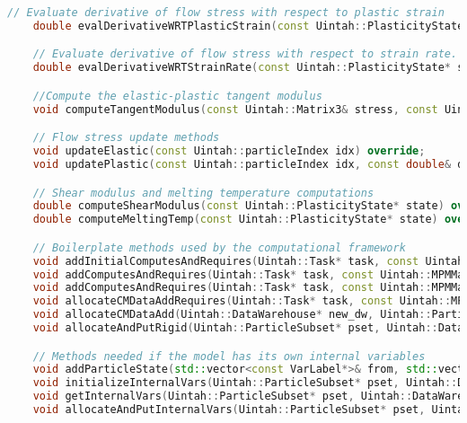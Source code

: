 \begin{enumerate}
\begin{lstlisting}[language=Cpp]
    // Evaluate derivative of flow stress with respect to plastic strain
    double evalDerivativeWRTPlasticStrain(const Uintah::PlasticityState* state, const Uintah::particleIndex idx) override;

    // Evaluate derivative of flow stress with respect to strain rate.
    double evalDerivativeWRTStrainRate(const Uintah::PlasticityState* state, const Uintah::particleIndex idx) override;

    //Compute the elastic-plastic tangent modulus
    void computeTangentModulus(const Uintah::Matrix3& stress, const Uintah::PlasticityState* state, const double& delT, const Uintah::MPMMaterial* matl, const Uintah::particleIndex idx, Uintah::TangentModulusTensor& Ce, Uintah::TangentModulusTensor& Cep) override;

    // Flow stress update methods
    void updateElastic(const Uintah::particleIndex idx) override;
    void updatePlastic(const Uintah::particleIndex idx, const double& delGamma) override;

    // Shear modulus and melting temperature computations
    double computeShearModulus(const Uintah::PlasticityState* state) override;
    double computeMeltingTemp(const Uintah::PlasticityState* state) override;

    // Boilerplate methods used by the computational framework
    void addInitialComputesAndRequires(Uintah::Task* task, const Uintah::MPMMaterial* matl, const Uintah::PatchSet* patches) override;
    void addComputesAndRequires(Uintah::Task* task, const Uintah::MPMMaterial* matl, const Uintah::PatchSet* patches) override;
    void addComputesAndRequires(Uintah::Task* task, const Uintah::MPMMaterial* matl, const Uintah::PatchSet* patches, bool recurse, bool schedParent) override;
    void allocateCMDataAddRequires(Uintah::Task* task, const Uintah::MPMMaterial* matl, const Uintah::PatchSet* patch, Uintah::MPMLabel* lb) override;
    void allocateCMDataAdd(Uintah::DataWarehouse* new_dw, Uintah::ParticleSubset* addset, Uintah::ParticleLabelVariableMap* newState, Uintah::ParticleSubset* delset, Uintah::DataWarehouse* old_dw) override;
    void allocateAndPutRigid(Uintah::ParticleSubset* pset, Uintah::DataWarehouse* new_dw) override;

    // Methods needed if the model has its own internal variables
    void addParticleState(std::vector<const VarLabel*>& from, std::vector<const VarLabel*>& to) override;
    void initializeInternalVars(Uintah::ParticleSubset* pset, Uintah::DataWarehouse* new_dw) override;
    void getInternalVars(Uintah::ParticleSubset* pset, Uintah::DataWarehouse* old_dw) override;
    void allocateAndPutInternalVars(Uintah::ParticleSubset* pset, Uintah::DataWarehouse* new_dw) override;


\end{lstlisting}
\end{enumerate}
